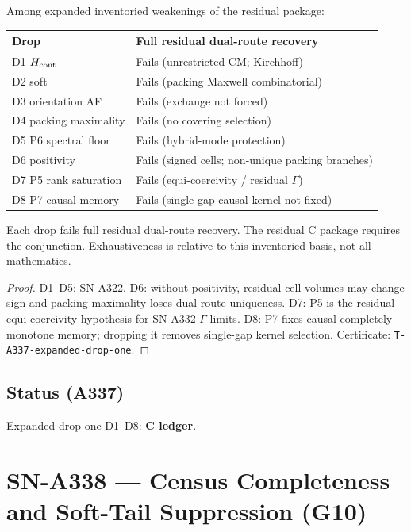 \begin{theorem}
\label{thm:A337}
Among expanded inventoried weakenings of the residual package:
\begin{center}
\begin{tabular}{@{}p{3.6cm}p{8.2cm}@{}}
\toprule
Drop & Full residual dual-route recovery \\
\midrule
D1 $H_{\rm cont}$ & Fails (unrestricted CM; Kirchhoff) \\
D2 soft & Fails (packing Maxwell combinatorial) \\
D3 orientation AF & Fails (exchange not forced) \\
D4 packing maximality & Fails (no covering selection) \\
D5 P6 spectral floor & Fails (hybrid-mode protection) \\
D6 positivity & Fails (signed cells; non-unique packing branches) \\
D7 P5 rank saturation & Fails (equi-coercivity / residual $\Gamma$) \\
D8 P7 causal memory & Fails (single-gap causal kernel not fixed) \\
\bottomrule
\end{tabular}
\end{center}
Each drop fails full residual dual-route recovery. The residual C package requires the conjunction. Exhaustiveness is relative to this inventoried basis, not all mathematics.
\end{theorem}

\begin{proof}
D1--D5: SN-A322. D6: without positivity, residual cell volumes may change sign and packing maximality loses dual-route uniqueness. D7: P5 is the residual equi-coercivity hypothesis for SN-A332 $\Gamma$-limits. D8: P7 fixes causal completely monotone memory; dropping it removes single-gap kernel selection. Certificate: \texttt{T-A337-expanded-drop-one}.
\end{proof}

\subsection*{Status (A337)}
Expanded drop-one D1--D8: \textbf{C ledger}.

\section{SN-A338 --- Census Completeness and Soft-Tail Suppression (G10)}
\label{sec:SN-A338}

